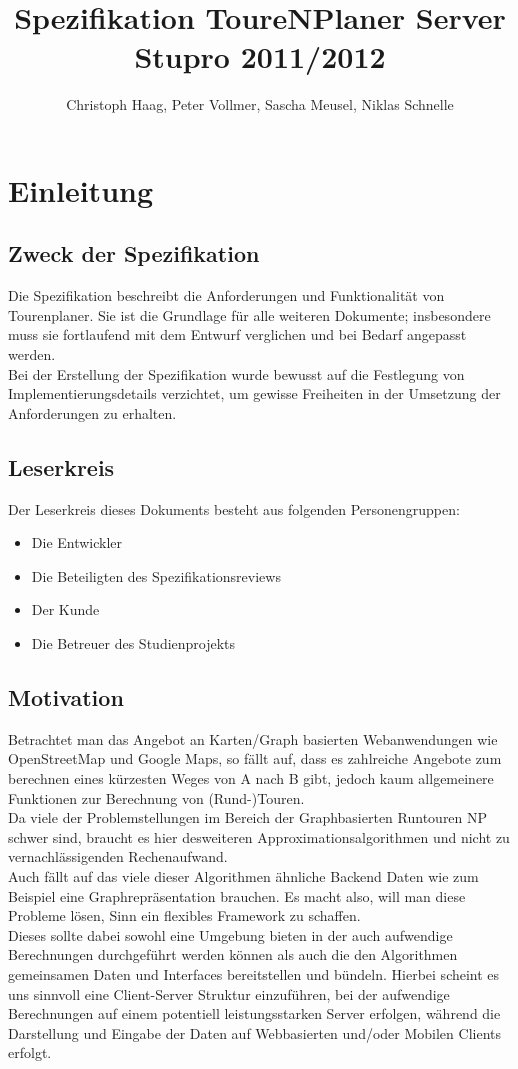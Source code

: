 \documentclass[a4paper,10pt,titlepage]{article}
\author{Christoph Haag, Peter Vollmer, Sascha Meusel, Niklas Schnelle}
\title{Spezifikation ToureNPlaner Server\\ Stupro 2011/2012}
\begin{document}
\maketitle
{}
\setcounter{page}{1}
\tableofcontents
\clearpage
{}
\setcounter{page}{1}

\section{Einleitung}
\subsection{Zweck der Spezifikation}
Die Spezifikation beschreibt die Anforderungen und Funktionalität von Tourenplaner. Sie ist die Grundlage für alle weiteren Dokumente; insbesondere muss sie fortlaufend mit dem Entwurf verglichen und bei Bedarf angepasst werden.\\
Bei der Erstellung der Spezifikation wurde bewusst auf die Festlegung von Implementierungsdetails verzichtet, um gewisse Freiheiten in der Umsetzung der Anforderungen zu erhalten.

\subsection{Leserkreis}
Der Leserkreis dieses Dokuments besteht aus folgenden Personengruppen:
\begin{itemize}
\item Die Entwickler
\item Die Beteiligten des Spezifikationsreviews
\item Der Kunde
\item Die Betreuer des Studienprojekts
\end{itemize}

\subsection{Motivation}
Betrachtet man das Angebot an Karten/Graph basierten Webanwendungen wie OpenStreetMap und Google Maps, so fällt auf, dass
es zahlreiche Angebote zum berechnen eines kürzesten Weges von A nach B gibt, jedoch kaum allgemeinere Funktionen zur
Berechnung von (Rund-)Touren.\\
Da viele der Problemstellungen im Bereich der Graphbasierten Runtouren NP schwer sind, braucht es hier desweiteren Approximationsalgorithmen und
nicht zu vernachlässigenden Rechenaufwand.\\
Auch fällt auf das viele dieser Algorithmen ähnliche Backend Daten wie zum Beispiel eine Graphrepräsentation brauchen. Es macht also, will man diese Probleme lösen,
Sinn ein flexibles Framework zu schaffen.\\
Dieses sollte dabei sowohl eine Umgebung bieten in der auch aufwendige Berechnungen durchgeführt werden können als auch die den Algorithmen gemeinsamen Daten und Interfaces
bereitstellen und bündeln. Hierbei scheint es uns sinnvoll eine Client-Server Struktur einzuführen, bei der aufwendige Berechnungen auf einem potentiell leistungsstarken Server erfolgen, während die Darstellung und Eingabe der Daten auf Webbasierten und/oder Mobilen Clients erfolgt.
\end{document}
